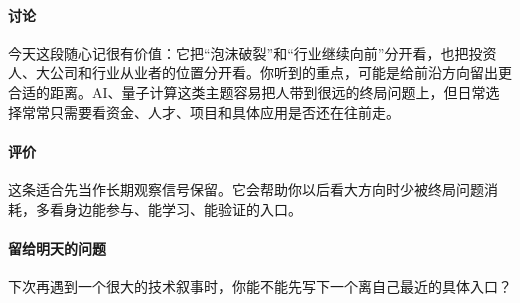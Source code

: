 \documentclass[UTF8,zihao=-4]{ctexart}
\begin{document}
\paragraph{讨论} 今天这段随心记很有价值：它把“泡沫破裂”和“行业继续向前”分开看，也把投资人、大公司和行业从业者的位置分开看。你听到的重点，可能是给前沿方向留出更合适的距离。AI、量子计算这类主题容易把人带到很远的终局问题上，但日常选择常常只需要看资金、人才、项目和具体应用是否还在往前走。
\paragraph{评价} 这条适合先当作长期观察信号保留。它会帮助你以后看大方向时少被终局问题消耗，多看身边能参与、能学习、能验证的入口。
\paragraph{留给明天的问题} 下次再遇到一个很大的技术叙事时，你能不能先写下一个离自己最近的具体入口？
\end{document}
